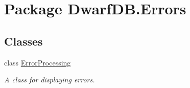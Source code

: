 \hypertarget{namespace_dwarf_d_b_1_1_errors}{
\section{Package DwarfDB.Errors}
\label{namespace_dwarf_d_b_1_1_errors}
}
\subsection*{Classes}
\begin{DoxyCompactItemize}
\item 
class \hyperlink{class_dwarf_d_b_1_1_errors_1_1_error_processing}{ErrorProcessing}
\begin{DoxyCompactList}\small\item\em A class for displaying errors. \item\end{DoxyCompactList}\end{DoxyCompactItemize}
